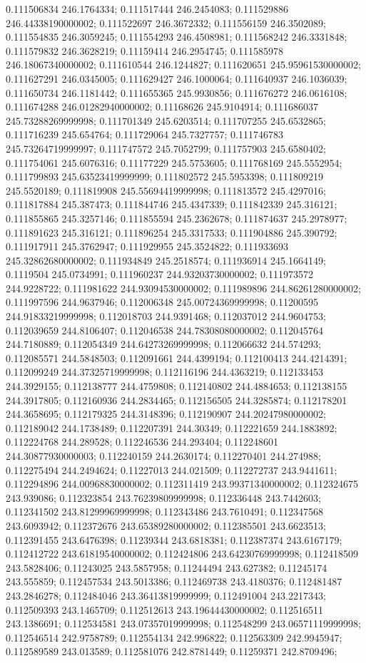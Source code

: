 0.111506834 246.1764334; 0.111517444 246.2454083; 0.111529886 246.44338190000002; 0.111522697 246.3672332; 0.111556159 246.3502089; 0.111554835 246.3059245; 0.111554293 246.4508981; 0.111568242 246.3331848; 0.111579832 246.3628219; 0.11159414 246.2954745; 0.111585978 246.18067340000002; 0.111610544 246.1244827; 0.111620651 245.95961530000002; 0.111627291 246.0345005; 0.111629427 246.1000064; 0.111640937 246.1036039; 0.111650734 246.1181442; 0.111655365 245.9930856; 0.111676272 246.0616108; 0.111674288 246.01282940000002; 0.11168626 245.9104914; 0.111686037 245.73288269999998; 0.111701349 245.6203514; 0.111707255 245.6532865; 0.111716239 245.654764; 0.111729064 245.7327757; 0.111746783 245.73264719999997; 0.111747572 245.7052799; 0.111757903 245.6580402; 0.111754061 245.6076316; 0.11177229 245.5753605; 0.111768169 245.5552954; 0.111799893 245.63523419999999; 0.111802572 245.5953398; 0.111809219 245.5520189; 0.111819908 245.55694419999998; 0.111813572 245.4297016; 0.111817884 245.387473; 0.111844746 245.4347339; 0.111842339 245.316121; 0.111855865 245.3257146; 0.111855594 245.2362678; 0.111874637 245.2978977; 0.111891623 245.316121; 0.111896254 245.3317533; 0.111904886 245.390792; 0.111917911 245.3762947; 0.111929955 245.3524822; 0.111933693 245.32862680000002; 0.111934849 245.2518574; 0.111936914 245.1664149; 0.1119504 245.0734991; 0.111960237 244.93203730000002; 0.111973572 244.9228722; 0.111981622 244.93094530000002; 0.111989896 244.86261280000002; 0.111997596 244.9637946; 0.112006348 245.00724369999998; 0.11200595 244.91833219999998; 0.112018703 244.9391468; 0.112037012 244.9604753; 0.112039659 244.8106407; 0.112046538 244.78308080000002; 0.112045764 244.7180889; 0.112054349 244.64273269999998; 0.112066632 244.574293; 0.112085571 244.5848503; 0.112091661 244.4399194; 0.112100413 244.4214391; 0.112099249 244.37325719999998; 0.112116196 244.4363219; 0.112133453 244.3929155; 0.112138777 244.4759808; 0.112140802 244.4884653; 0.112138155 244.3917805; 0.112160936 244.2834465; 0.112156505 244.3285874; 0.112178201 244.3658695; 0.112179325 244.3148396; 0.112190907 244.20247980000002; 0.112189042 244.1738489; 0.112207391 244.30349; 0.112221659 244.1883892; 0.112224768 244.289528; 0.112246536 244.293404; 0.112248601 244.30877930000003; 0.112240159 244.2630174; 0.112270401 244.274988; 0.112275494 244.2494624; 0.11227013 244.021509; 0.112272737 243.9441611; 0.112294896 244.00968830000002; 0.112311419 243.99371340000002; 0.112324675 243.939086; 0.112323854 243.76239809999998; 0.112336448 243.7442603; 0.112341502 243.81299969999998; 0.112343486 243.7610491; 0.112347568 243.6093942; 0.112372676 243.65389280000002; 0.112385501 243.6623513; 0.112391455 243.6476398; 0.11239344 243.6818381; 0.112387374 243.6167179; 0.112412722 243.61819540000002; 0.112424806 243.64230769999998; 0.112418509 243.5828406; 0.11243025 243.5857958; 0.11244494 243.627382; 0.11245174 243.555859; 0.112457534 243.5013386; 0.112469738 243.4180376; 0.112481487 243.2846278; 0.112484046 243.36413819999999; 0.112491004 243.2217343; 0.112509393 243.1465709; 0.112512613 243.19644430000002; 0.112516511 243.1386691; 0.112534581 243.07357019999998; 0.112548299 243.06571119999998; 0.112546514 242.9758789; 0.112554134 242.996822; 0.112563309 242.9945947; 0.112589589 243.013589; 0.112581076 242.8781449; 0.11259371 242.8709496; 